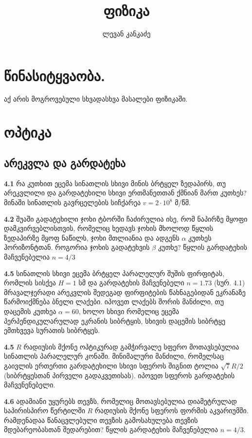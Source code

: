\documentclass[a4paper]{book}
\title{ფიზიკა}
\author{ლევან კანკაძე}
\begin{document}
\maketitle

\tableofcontents

\chapter{წინასიტყვაობა.}
აქ არის მოგროვებული სხვადასხვა მასალები ფიზიკაში.

\chapter{ოპტიკა}
\section{არეკვლა და გარდატეხა}
\qquad \textbf{4.1} რა კუთხით ეცემა სინათლის სხივი მინის ბრტყელ ზედაპირს, თუ არეკვლილი და გარდატეხილი სხივი ერთმანეთთან ქმნიან მართ კუთხეს? მინაში სინათლის გავრცელების სიჩქარეა $v = 2 \cdot 10^8$ მ/წმ.

\textbf{4.2} შუაში გადატეხილი ჯოხი ტბორში ჩაძირულია ისე, რომ ნაპირზე მყოფი დამკვირვებლისთვის, რომელიც ხედავს ჯოხის მხოლოდ წყლის ზედაპირზე მყოფ ნაწილს, ჯოხი მთლიანია და ადგენს $\alpha$ კუთხეს ჰორიზონტთან. როგორია ჯოხის გადატეხვის $\beta$ კუთხე? წყლის გარდატეხის მაჩვენებელია $n = 4/3$

\textbf{4.5} სინათლის სხივი ეცემა ბრტყელ პარალელურ შუშის ფირფიტას, რომლის სისქეა $H=1$ სმ და გარდატეხის მაჩვენებელი $n=1.73$ (სურ. 4.1) მრავალჯერადი არეკვლის შედეგად ფირფიტების წახნაგებიდან ეკრანაზე წარმოიქმნება ბნელი ლაქები. იპოვეთ ლაქებს შორის მანძილი, თუ დაცემის კუთხეა $\alpha=60$, ხოლო სხივი რომელიც ეცემა პერპენდიკულარულად ეკრანის სიბრტყის, სხივის დაცემის სიბრტყე ემთხვევა სურათის სიბრტყეს.  

\textbf{4.5}
$R$ რადიუსის მქონე ოპტიკურად გამჭირვალე სფერო მოთავსებულია სინათლის პარალელურ კონაში. მინიმალური 
მანძილი, რომელსაც გაივლის ერთერთი გარდატეხილი სხივი სფეროს შიგნით ტოლია $\sqrt{7}R/2$ (სიბრტყესთან პირველი გადაკვეთისას). იპოვეთ სფეროს გარდატეხის მაჩვენენებელი.

\textbf{4.6} ადამიანი უყურებს თევზს, რომელიც მოთავსებულია დიამეტრულად საპირისპირო წერტილში $R$ რადიუსის მქონე სფეროს ფორმის აკვარიუმში. რამდენადაა წანაცვლებული თევზის გამოსახულება თევზის მდებარეობასთან შედარებით? წყლის გარდატეხის მაჩვენებელია $n = 4/3$.
\end{document}
